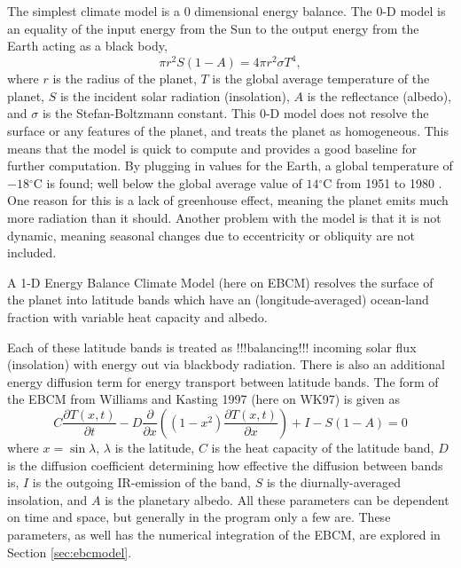 \documentclass[12pt, onecolumn]{revtex4-2}    %
\newcommand{\degrees}{\ensuremath{^{\circ}}}
\begin{document}
The simplest climate model is a 0 dimensional energy balance.
The 0-D model is an equality of the input energy from the Sun to the output energy from the Earth acting as a black body,
\begin{equation}
    \pi r^2 S(1-A) = 4 \pi r^2 \sigma T^4, \label{eq:0DEBCM}
\end{equation}
where $r$ is the radius of the planet, $T$ is the global average temperature of the planet, $S$ is the incident solar radiation (insolation), $A$ is the reflectance (albedo), and $\sigma$ is the Stefan-Boltzmann constant.
This 0-D model does not resolve the surface or any features of the planet, and treats the planet as homogeneous.
This means that the model is quick to compute and provides a good baseline for further computation.
By plugging in values for the Earth, a global temperature of $-18\degrees$C is found; well below the global average value of $14\degrees$C from 1951 to 1980 \cite{NASAGlobTemp}.
One reason for this is a lack of greenhouse effect, meaning the planet emits much more radiation than it should.
Another problem with the model is that it is not dynamic, meaning seasonal changes due to eccentricity or obliquity are not included.

A 1-D Energy Balance Climate Model (here on EBCM) resolves the surface of the planet into latitude bands which have an (longitude-averaged) ocean-land fraction with variable heat capacity and albedo.

Each of these latitude bands is treated as !!!balancing!!! incoming solar flux (insolation) with energy out via blackbody radiation.
There is also an additional energy diffusion term for energy transport between latitude bands.
The form of the EBCM from Williams and Kasting 1997 (here on WK97) is given as
\begin{equation}
    C\frac{\partial T(x, t)}{\partial t} - D \frac{\partial}{\partial x} \left((1-x^2)\frac{\partial T(x, t)}{\partial x}\right) + I - S(1-A) = 0
    \label{eq:PDE_in_x}
\end{equation}
where $x=\sin\lambda$, $\lambda$ is the latitude, $C$ is the heat capacity of the latitude band,
$D$ is the diffusion coefficient determining how effective the diffusion between bands is,
$I$ is the outgoing IR-emission of the band,
$S$ is the diurnally-averaged insolation,
and $A$ is the planetary albedo.
All these parameters can be dependent on time and space, but generally in the program only a few are.
These parameters, as well has the numerical integration of the EBCM, are explored in Section \ref{sec:ebcmodel}.
\end{document}
